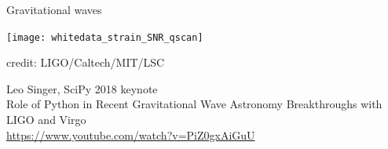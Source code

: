 \documentclass[svgnames]{beamer}
\begin{document}
\begin{frame}{Gravitational waves}
 \begin{center}
  \begin{minipage}{0.8\textwidth}
   \texttt{[image: whitedata\_strain\_SNR\_qscan]}

   \vspace{-0.4truecm}
   \begin{flushright}
    \footnotesize credit: LIGO/Caltech/MIT/LSC
   \end{flushright}
  \end{minipage}
 \end{center}

 \quad Leo Singer, SciPy 2018 keynote\\
 Role of Python in Recent Gravitational Wave Astronomy Breakthroughs with LIGO and Virgo\\
 \url{https://www.youtube.com/watch?v=PiZ0gxAiGuU}
\end{frame}
\end{document}
